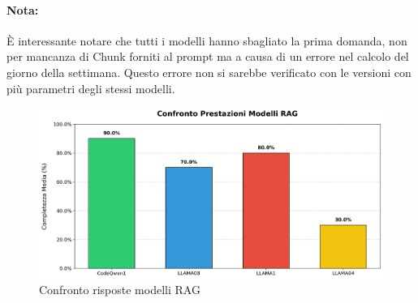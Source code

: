 \documentclass[12pt,a4paper,openright,twoside]{book}
\begin{document}
\paragraph{Nota:} È interessante notare che tutti i modelli hanno sbagliato la prima domanda,
non per mancanza di Chunk forniti al prompt ma a causa di un errore nel calcolo del giorno della settimana.
Questo errore non si sarebbe verificato con le versioni con più parametri degli stessi modelli.
\newpage
\begin{figure}[h]
    \centering
    \includegraphics[width=\textwidth]{confronto_valutazioni_modelli.png}
    \caption{Confronto risposte modelli RAG}
    \label{fig:confronto-modelli}
\end{figure}
\end{document}
